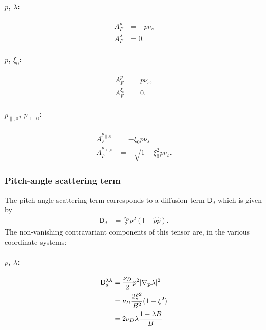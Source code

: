 \documentclass[11pt,a4paper]{article}
\renewcommand{\b}[1]{\ensuremath{ {\bf #1 } }}
\begin{document}
\paragraph{$p$, $\lambda$:}
\begin{align}
A_F^p &= -p\nu_s \nonumber \\
A_F^\lambda &=  0. 
\end{align}

\paragraph{$p$, $\xi_0$:}
\begin{align}
A_F^p &= p\nu_s, \nonumber \\
A_F^{\xi_0} &=  0.
\end{align}

\paragraph{$p_{\parallel,0}$, $p_{\perp,0}$:}
\begin{align}
A_F^{p_{\parallel,0}} &= -\xi_0 p\nu_s \nonumber \\
A_F^{p_{\perp,0}} &= -\sqrt{1-\xi_0^2}p\nu_s.
\end{align}


\subsubsection*{Pitch-angle scattering term}
The pitch-angle scattering term corresponds to a diffusion term $\mathsf{D}_d$ which is given by
\begin{align}
\mathsf{D}_d &=  \frac{\nu_D}{2} p^2\left(\mathsf{I}  - \hat{p}\hat{p}\right).
\end{align} 
The non-vanishing contravariant components of this tensor are, in the various coordinate systems:


\paragraph{$p$, $\lambda$:}
\begin{align}
\mathsf{D}_d^{\lambda \lambda} &=  \frac{\nu_D}{2}p^2 |\nabla_\b{p}\lambda|^2 \nonumber \\
&= \nu_D \frac{2\xi^2}{B^2}(1-\xi^2) \nonumber \\
&= 2\nu_D \lambda \frac{1-\lambda B}{B}
\end{align}
\end{document}

